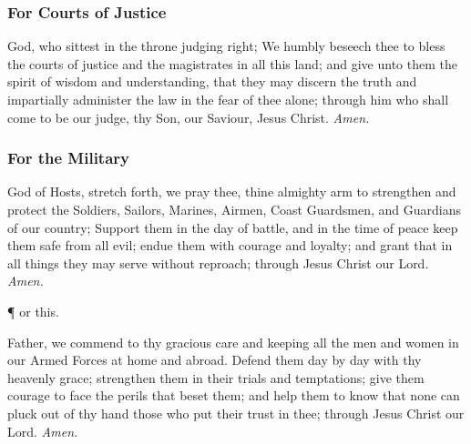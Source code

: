 \subsubsection{For Courts of Justice}

 God, who sittest in the throne judging right; We humbly beseech thee to bless the courts of justice and the magistrates in all this land; and give unto them the spirit of wisdom and understanding, that they may discern the truth and impartially administer the law in the fear of thee alone; through him who shall come to be our judge, thy Son, our Saviour, Jesus Christ. \textit{Amen.}

\subsubsection{For the Military}
 God of Hosts, stretch forth, we pray thee, thine almighty arm to strengthen and protect the Soldiers, Sailors, Marines, Airmen, Coast Guardsmen, and Guardians of our country; Support them in the day of battle, and in the time of peace keep them safe from all evil; endue them with courage and loyalty; and grant that in all things they may serve without reproach; through Jesus Christ our Lord. \textit{Amen.}

\vspace{0.25\baselineskip}

\begin{inhead}
	\P{ }or this.
\end{inhead}

\vspace{0.25\baselineskip}

 Father, we commend to thy gracious care and keeping all the men and women in our Armed Forces at home and abroad. Defend them day by day with thy heavenly grace; strengthen them in their trials and temptations; give them courage to face the perils that beset them; and help them to know that none can pluck out of thy hand those who put their trust in thee; through Jesus Christ our Lord. \textit{Amen.}


